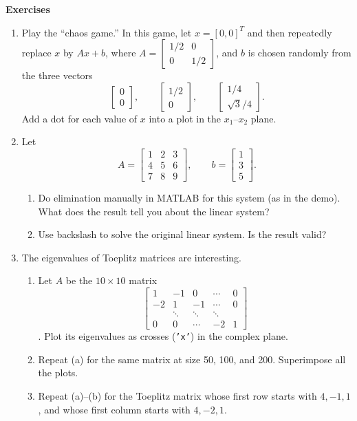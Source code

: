 \documentclass[11pt]{article}
\begin{document}
\begin{center}
  \bf Exercises
\end{center}

\begin{enumerate}
\item Play the ``chaos game.'' In this game, let $x=[0,0]^T$ and then
  repeatedly replace $x$ by $Ax+b$, where $A=\displaystyle
  \begin{bmatrix}
    1/2&0\\0&1/2
  \end{bmatrix}$, and $b$ is chosen randomly from the three vectors
\[
\begin{bmatrix}
  0\\0
\end{bmatrix}, \qquad
\begin{bmatrix}
  1/2\\0
\end{bmatrix},\qquad
\begin{bmatrix}
  1/4\\ \sqrt{3}/4
\end{bmatrix}.
\]
Add a dot for each value of $x$ into a plot in the $x_1$--$x_2$
plane.
\item Let 
\[
A=
\begin{bmatrix}
  1&2&3\\4&5&6\\7&8&9
\end{bmatrix}, \qquad b=
\begin{bmatrix}
  1\\3\\5
\end{bmatrix}.
\]

\begin{enumerate}
\item Do elimination manually in MATLAB for this system (as in the
  demo). What does the result tell you about the linear system?
\item Use backslash to solve the original linear system. Is the result valid?
\end{enumerate}

\item The eigenvalues of Toeplitz matrices are interesting.
  \begin{enumerate}
  \item Let $A$ be the $10\times 10$ matrix
    \[
    \begin{bmatrix}
      1 & -1 & 0 & \cdots & 0 \\
      -2 & 1 & -1 & \cdots & 0 \\
      & \ddots & \ddots & \ddots & \\
      0 & 0 & \cdots & -2 & 1 
    \end{bmatrix}
    \].
    Plot its eigenvalues as crosses (\texttt{'x'}) in the complex plane.
  \item Repeat (a) for the same matrix at size 50, 100, and
    200. Superimpose all the plots.
  \item Repeat (a)--(b) for the Toeplitz matrix whose first row starts
    with $4,-1,1$, and whose first column starts with $4,-2,1$. 
 \end{enumerate}


\end{enumerate}
\end{document}
